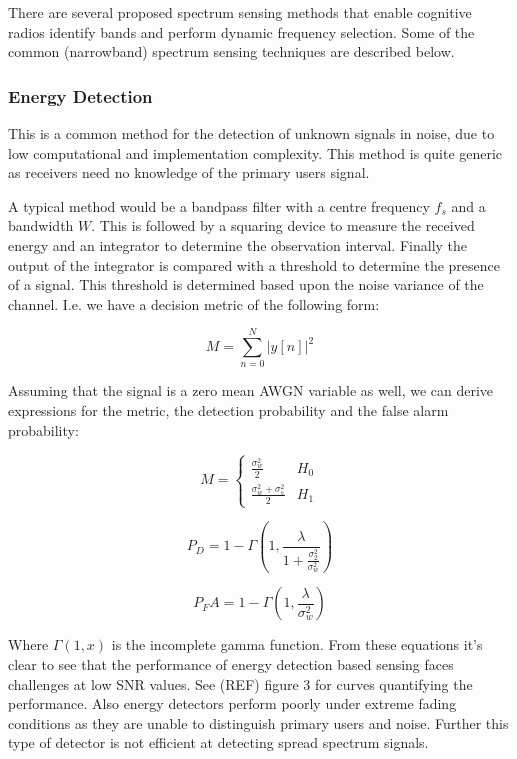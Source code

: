 \documentclass[12pt, a4paper]{article}
\begin{document}
There are several proposed spectrum sensing methods that enable cognitive radios identify bands and perform dynamic frequency selection. Some of the common (narrowband) spectrum sensing techniques are described below.

\subsubsection{Energy Detection}
This is a common method for the detection of unknown signals in noise, due to low computational and implementation complexity. This method is quite generic as receivers need no knowledge of the primary users signal. 

A typical method would be a bandpass filter with a centre frequency \(f_{s}\) and a bandwidth \(W\). This is followed by a squaring device to measure the received energy and an integrator to determine the observation interval. Finally the output of the integrator is compared with a threshold to determine the presence of a signal. This threshold is determined based upon the noise variance of the channel. I.e. we have a decision metric of the following form:

\begin{equation}
M = \sum_{n=0}^N |y\left[n\right]|^2
\end{equation}

Assuming that the signal is a zero mean AWGN variable as well, we can derive expressions for the metric, the detection probability and the false alarm probability:

\begin{equation}
 M =
  \begin{cases}
   \frac{\sigma_w^2}{2} & H_0 \\
   \frac{\sigma_w^2 + \sigma_s^2}{2} & H_1
  \end{cases}
\end{equation}

\begin{equation}
P_D = 1 - \Gamma\left(1, \frac{\lambda}{1 + \frac{ \sigma_2^2 }{ \sigma_w^2 } } \right)
\end{equation}

\begin{equation}
P_FA = 1 - \Gamma\left(1, \frac{\lambda}{\sigma_w^2} \right)
\end{equation}

Where \( \Gamma\left(1,x\right)\) is the incomplete gamma function. From these equations it's clear to see that the performance of energy detection based sensing faces challenges at low SNR values. See (REF) figure 3 for curves quantifying the performance. Also energy detectors perform poorly under extreme fading conditions as they are unable to distinguish primary users and noise. Further this type of detector is not efficient at detecting spread spectrum signals. 
\end{document}
